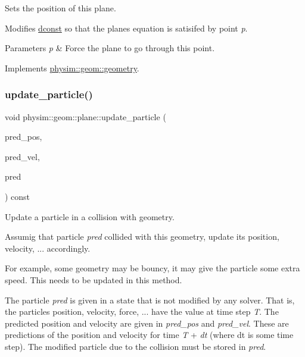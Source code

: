 Sets the position of this plane. 

Modifies \hyperlink{classphysim_1_1geom_1_1plane_a80867844aac8461bd644cca6de9ef739}{dconst} so that the plane\textquotesingle{}s equation is satisifed by point {\itshape p}. 
\begin{DoxyParams}{Parameters}
{\em p} & Force the plane to go through this point. \\
\hline
\end{DoxyParams}


Implements \hyperlink{classphysim_1_1geom_1_1geometry_adbd7c270a0b49c2c6d085457a20bfa69}{physim\+::geom\+::geometry}.

\mbox{\label{classphysim_1_1geom_1_1plane_af40afe0d75150a4b45de85a2197137f1}} 
\subsubsection{\texorpdfstring{update\+\_\+particle()}{update\_particle()}}
{\footnotesize\ttfamily void physim\+::geom\+::plane\+::update\+\_\+particle (\begin{DoxyParamCaption}\item[{const \hyperlink{structphysim_1_1math_1_1vec3}{math\+::vec3} \&}]{pred\+\_\+pos,  }\item[{const \hyperlink{structphysim_1_1math_1_1vec3}{math\+::vec3} \&}]{pred\+\_\+vel,  }\item[{\hyperlink{classphysim_1_1particles_1_1free__particle}{particles\+::free\+\_\+particle} $\ast$}]{pred }\end{DoxyParamCaption}) const\hspace{0.3cm}{\ttfamily [virtual]}}



Update a particle in a collision with geometry. 

Assumig that particle {\itshape pred} collided with this geometry, update its position, velocity, ... accordingly.

For example, some geometry may be \textquotesingle{}bouncy\textquotesingle{}, it may give the particle some extra speed. This needs to be updated in this method.

The particle {\itshape pred} is given in a state that is not modified by any solver. That is, the particle\textquotesingle{}s position, velocity, force, ... have the value at time step {\itshape T}. The predicted position and velocity are given in {\itshape pred\+\_\+pos} and {\itshape pred\+\_\+vel}. These are predictions of the position and velocity for time {\itshape T} + {\itshape dt} (where dt is some time step). The modified particle due to the collision must be stored in {\itshape pred}.

